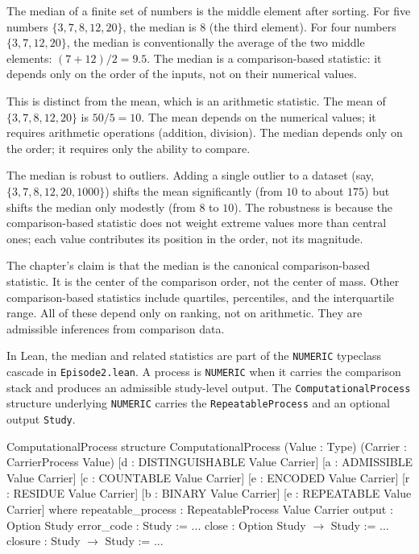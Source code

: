 The median of a finite set of numbers is the middle element after sorting.
For five numbers $\{3, 7, 8, 12, 20\}$, the median is 8 (the third
element). For four numbers $\{3, 7, 12, 20\}$, the median is conventionally
the average of the two middle elements: $(7 + 12)/2 = 9.5$. The median is
a comparison-based statistic: it depends only on the order of the inputs,
not on their numerical values.

This is distinct from the mean, which is an arithmetic statistic. The mean
of $\{3, 7, 8, 12, 20\}$ is $50/5 = 10$. The mean depends on the
numerical values; it requires arithmetic operations (addition, division).
The median depends only on the order; it requires only the ability to
compare.

The median is robust to outliers. Adding a single outlier to a dataset
(say, $\{3, 7, 8, 12, 20, 1000\}$) shifts the mean significantly (from
$10$ to about $175$) but shifts the median only modestly (from $8$ to
$10$). The robustness is because the comparison-based statistic does
not weight extreme values more than central ones; each value
contributes its position in the order, not its magnitude.

The chapter's claim is that the median is the canonical comparison-based
statistic. It is the center of the comparison order, not the center of
mass. Other comparison-based statistics include quartiles, percentiles,
and the interquartile range. All of these depend only on ranking, not
on arithmetic. They are admissible inferences from comparison data.

In Lean, the median and related statistics are part of the
\texttt{NUMERIC} typeclass cascade in \texttt{Episode2.lean}. A process
is \texttt{NUMERIC} when it carries the comparison stack and produces
an admissible study-level output. The \texttt{ComputationalProcess}
structure underlying \texttt{NUMERIC} carries the
\texttt{RepeatableProcess} and an optional output \texttt{Study}.

\begin{leanexcerpt}{ComputationalProcess}
structure ComputationalProcess
    (Value : Type)
    (Carrier : CarrierProcess Value)
    [d : DISTINGUISHABLE Value Carrier]
    [a : ADMISSIBLE Value Carrier]
    [c : COUNTABLE Value Carrier]
    [e : ENCODED Value Carrier]
    [r : RESIDUE Value Carrier]
    [b : BINARY Value Carrier]
    [e : REPEATABLE Value Carrier]
  where
  repeatable_process : RepeatableProcess Value Carrier
  output : Option Study
  error_code : Study := ...
  close   : Option Study $\to$ Study := ...
  closure : Study $\to$ Study := ...
\end{leanexcerpt}

